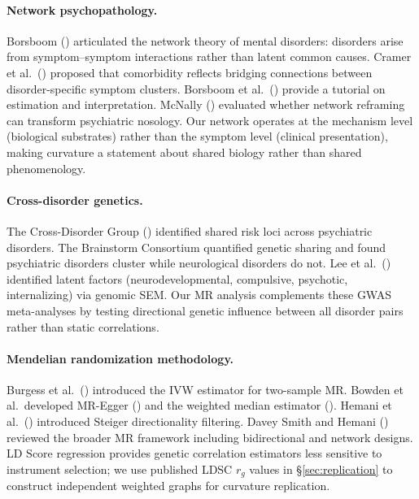 \documentclass[11pt]{article}
\begin{document}
\paragraph{Network psychopathology.} Borsboom (\citeyear{borsboom2017network}) articulated the network theory of mental disorders: disorders arise from symptom--symptom interactions rather than latent common causes. Cramer et al.\ (\citeyear{cramer2010comorbidity}) proposed that comorbidity reflects bridging connections between disorder-specific symptom clusters. Borsboom et al.\ (\citeyear{borsboom2021network}) provide a tutorial on estimation and interpretation. McNally (\citeyear{mcnally2016can}) evaluated whether network reframing can transform psychiatric nosology. Our network operates at the mechanism level (biological substrates) rather than the symptom level (clinical presentation), making curvature a statement about shared biology rather than shared phenomenology.

\paragraph{Cross-disorder genetics.} The Cross-Disorder Group (\citeyear{crossdisorder2013identification, crossdisorder2019genomic}) identified shared risk loci across psychiatric disorders. The Brainstorm Consortium \citep{anttila2018analysis} quantified genetic sharing and found psychiatric disorders cluster while neurological disorders do not. Lee et al.\ (\citeyear{lee2022genetic}) identified latent factors (neurodevelopmental, compulsive, psychotic, internalizing) via genomic SEM. Our MR analysis complements these GWAS meta-analyses by testing directional genetic influence between all disorder pairs rather than static correlations.

\paragraph{Mendelian randomization methodology.} Burgess et al.\ (\citeyear{burgess2013mendelian}) introduced the IVW estimator for two-sample MR. Bowden et al.\ developed MR-Egger (\citeyear{bowden2015mendelian}) and the weighted median estimator (\citeyear{bowden2016consistent}). Hemani et al.\ (\citeyear{hemani2017orienting}) introduced Steiger directionality filtering. Davey Smith and Hemani (\citeyear{daveysmith2014mendelian}) reviewed the broader MR framework including bidirectional and network designs. LD Score regression \citep{buliksullivan2015ld, buliksullivan2015atlas} provides genetic correlation estimators less sensitive to instrument selection; we use published LDSC $r_g$ values in \S\ref{sec:replication} to construct independent weighted graphs for curvature replication.
\end{document}
